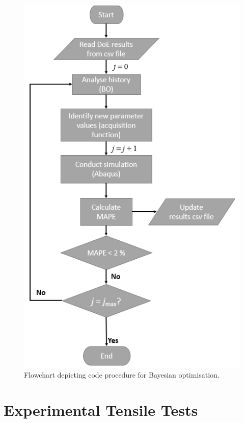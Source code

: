 \documentclass[preprint, review, 12pt]{elsarticle}
\begin{document}
{	\begin{figure}[!htbp]
		\centering
		\includegraphics[width=\linewidth, height=0.8\textheight, keepaspectratio]{BO_FLOWCHART}
		\caption{Flowchart depicting code procedure for Bayesian optimisation.}
		\label{fig:bo_flowchart}
	\end{figure}

	\section{Experimental Tensile Tests}
	\label{h:tensile_tests}

}
\end{document}
